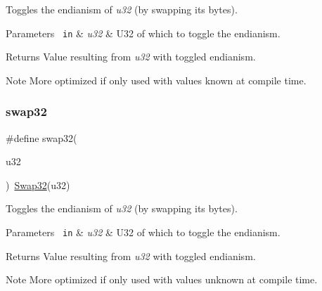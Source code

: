 Toggles the endianism of {\itshape u32} (by swapping its bytes). 


\begin{DoxyParams}[1]{Parameters}
\mbox{\texttt{ in}}  & {\em u32} & U32 of which to toggle the endianism.\\
\hline
\end{DoxyParams}
\begin{DoxyReturn}{Returns}
Value resulting from {\itshape u32} with toggled endianism.
\end{DoxyReturn}
\begin{DoxyNote}{Note}
More optimized if only used with values known at compile time. 
\end{DoxyNote}
\mbox{\label{group__group__sam0__utils_ga46025d8a12ccc9f4268c84e56c457416}} 
\subsubsection{\texorpdfstring{swap32}{swap32}}
{\footnotesize\ttfamily \#define swap32(\begin{DoxyParamCaption}\item[{}]{u32 }\end{DoxyParamCaption})~\mbox{\hyperlink{group__group__sam0__utils_ga5e9bc2e3b3e43eadc3210b02cab6ac64}{Swap32}}(u32)}



Toggles the endianism of {\itshape u32} (by swapping its bytes). 


\begin{DoxyParams}[1]{Parameters}
\mbox{\texttt{ in}}  & {\em u32} & U32 of which to toggle the endianism.\\
\hline
\end{DoxyParams}
\begin{DoxyReturn}{Returns}
Value resulting from {\itshape u32} with toggled endianism.
\end{DoxyReturn}
\begin{DoxyNote}{Note}
More optimized if only used with values unknown at compile time. 
\end{DoxyNote}
\mbox{\label{group__group__sam0__utils_ga33f3049d9b8374e8b93d5642bfe7f426}} 
